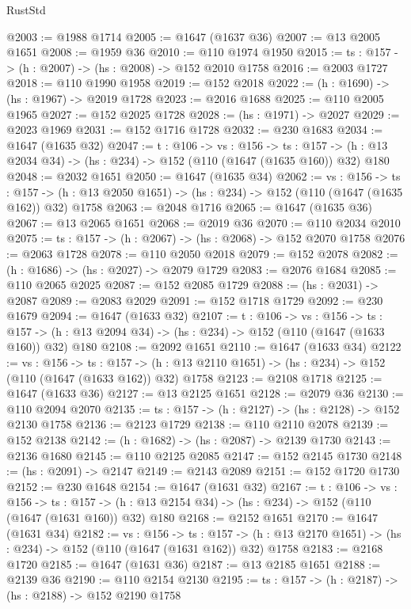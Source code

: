 \begin{lexlean}{RustStd}
\begin{coremodule}
@2003 := @1988 @1714
@2005 := @1647 (@1637 @36)
@2007 := @13 @2005 @1651
@2008 := @1959 @36
@2010 := @110 @1974 @1950
@2015 := {ts : @157} -> (h : @2007) -> (hs : @2008) -> @152 @2010 @1758
@2016 := @2003 @1727
@2018 := @110 @1990 @1958
@2019 := @152 @2018
@2022 := (h : @1690) -> (hs : @1967) -> @2019 @1728
@2023 := @2016 @1688
@2025 := @110 @2005 @1965
@2027 := @152 @2025 @1728
@2028 := (hs : @1971) -> @2027
@2029 := @2023 @1969
@2031 := @152 @1716 @1728
@2032 := @230 @1683
@2034 := @1647 (@1635 @32)
@2047 := {t : @106} ->
  {vs : @156} ->
  {ts : @157} -> (h : @13 @2034 @34) -> (hs : @234) -> @152 (@110 (@1647 (@1635 @160)) @32) @180
@2048 := @2032 @1651
@2050 := @1647 (@1635 @34)
@2062 := {vs : @156} ->
  {ts : @157} -> (h : @13 @2050 @1651) -> (hs : @234) -> @152 (@110 (@1647 (@1635 @162)) @32) @1758
@2063 := @2048 @1716
@2065 := @1647 (@1635 @36)
@2067 := @13 @2065 @1651
@2068 := @2019 @36
@2070 := @110 @2034 @2010
@2075 := {ts : @157} -> (h : @2067) -> (hs : @2068) -> @152 @2070 @1758
@2076 := @2063 @1728
@2078 := @110 @2050 @2018
@2079 := @152 @2078
@2082 := (h : @1686) -> (hs : @2027) -> @2079 @1729
@2083 := @2076 @1684
@2085 := @110 @2065 @2025
@2087 := @152 @2085 @1729
@2088 := (hs : @2031) -> @2087
@2089 := @2083 @2029
@2091 := @152 @1718 @1729
@2092 := @230 @1679
@2094 := @1647 (@1633 @32)
@2107 := {t : @106} ->
  {vs : @156} ->
  {ts : @157} -> (h : @13 @2094 @34) -> (hs : @234) -> @152 (@110 (@1647 (@1633 @160)) @32) @180
@2108 := @2092 @1651
@2110 := @1647 (@1633 @34)
@2122 := {vs : @156} ->
  {ts : @157} -> (h : @13 @2110 @1651) -> (hs : @234) -> @152 (@110 (@1647 (@1633 @162)) @32) @1758
@2123 := @2108 @1718
@2125 := @1647 (@1633 @36)
@2127 := @13 @2125 @1651
@2128 := @2079 @36
@2130 := @110 @2094 @2070
@2135 := {ts : @157} -> (h : @2127) -> (hs : @2128) -> @152 @2130 @1758
@2136 := @2123 @1729
@2138 := @110 @2110 @2078
@2139 := @152 @2138
@2142 := (h : @1682) -> (hs : @2087) -> @2139 @1730
@2143 := @2136 @1680
@2145 := @110 @2125 @2085
@2147 := @152 @2145 @1730
@2148 := (hs : @2091) -> @2147
@2149 := @2143 @2089
@2151 := @152 @1720 @1730
@2152 := @230 @1648
@2154 := @1647 (@1631 @32)
@2167 := {t : @106} ->
  {vs : @156} ->
  {ts : @157} -> (h : @13 @2154 @34) -> (hs : @234) -> @152 (@110 (@1647 (@1631 @160)) @32) @180
@2168 := @2152 @1651
@2170 := @1647 (@1631 @34)
@2182 := {vs : @156} ->
  {ts : @157} -> (h : @13 @2170 @1651) -> (hs : @234) -> @152 (@110 (@1647 (@1631 @162)) @32) @1758
@2183 := @2168 @1720
@2185 := @1647 (@1631 @36)
@2187 := @13 @2185 @1651
@2188 := @2139 @36
@2190 := @110 @2154 @2130
@2195 := {ts : @157} -> (h : @2187) -> (hs : @2188) -> @152 @2190 @1758

\end{coremodule}
\end{lexlean}
